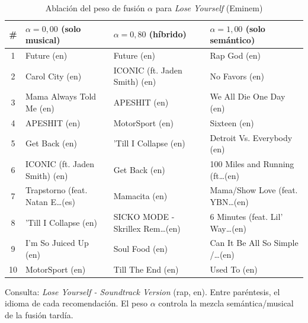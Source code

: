 \begin{table}[htbp]
  \centering
  \begin{threeparttable}
  \caption{Ablación del peso de fusión $\alpha$ para \emph{Lose Yourself} (Eminem)}
  \label{tab:qual_ablation_lose_yourself}
  \footnotesize
  \begin{tabular}{c p{3.9cm} p{3.9cm} p{3.9cm}}
    \toprule
    \# & $\alpha=0{,}00$ (solo musical) & $\alpha=0{,}80$ (híbrido) & $\alpha=1{,}00$ (solo semántico) \\
    \midrule
    1 & Future (en) & Future (en) & Rap God (en) \\
    2 & Carol City (en) & ICONIC (ft. Jaden Smith) (en) & No Favors (en) \\
    3 & Mama Always Told Me (en) & APESHIT (en) & We All Die One Day (en) \\
    4 & APESHIT (en) & MotorSport (en) & Sixteen (en) \\
    5 & Get Back (en) & 'Till I Collapse (en) & Detroit Vs. Everybody (en) \\
    6 & ICONIC (ft. Jaden Smith) (en) & Get Back (en) & 100 Miles and Running (ft\ldots (en) \\
    7 & Trapstorno (feat. Natan E\ldots (es) & Mamacita (en) & Mama/Show Love (feat. YBN\ldots (en) \\
    8 & 'Till I Collapse (en) & SICKO MODE - Skrillex Rem\ldots (en) & 6 Minutes (feat. Lil' Way\ldots (en) \\
    9 & I'm So Juiced Up (en) & Soul Food (en) & Can It Be All So Simple /\ldots (en) \\
    10 & MotorSport (en) & Till The End (en) & Used To (en) \\
    \bottomrule
  \end{tabular}
  \begin{tablenotes}[flushleft]
    \small
    \item Consulta: \emph{Lose Yourself - Soundtrack Version} (rap, en). Entre paréntesis, el idioma de cada recomendación. El peso $\alpha$ controla la mezcla semántica/musical de la fusión tardía.
  \end{tablenotes}
  \end{threeparttable}
\end{table}